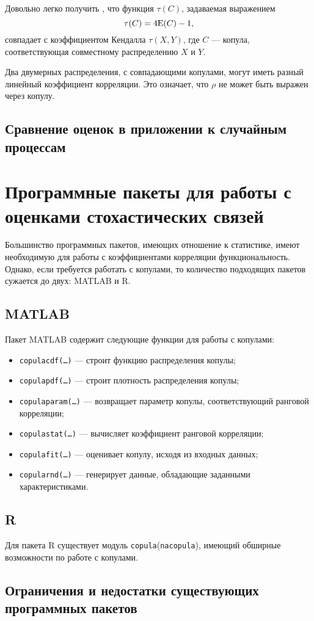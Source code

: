 Довольно легко получить \cite{Nelsen1999}, что функция $\tau(C)$, задаваемая выражением
\begin{equation}
	\tau(C) = 4\mathrm{E}(C) - 1,
\end{equation}
совпадает с коэффициентом Кендалла $\tau(X, Y)$, где $C$ --- копула, соответствующая совместному распределению $X$ и $Y$.

Два двумерных распределения, с совпадающими копулами, могут иметь разный линейный коэффициент корреляции. Это означает, что $\rho$ не может быть выражен через копулу.

\subsection*{Сравнение оценок в приложении к случайным процессам}

\section*{Программные пакеты для работы с оценками стохастических связей}
Большинство программных пакетов, имеющих отношение к статистике, имеют необходимую для работы с коэффициентами корреляции функциональность. Однако, если требуется работать с копулами, то количество подходящих пакетов сужается до двух: MATLAB и R.

\subsection*{MATLAB}
Пакет MATLAB содержит следующие функции для работы с копулами:
\begin{itemize}
	\item \texttt{copulacdf(\ldots)} --- строит функцию распределения копулы;
	\item \texttt{copulapdf(\ldots)} --- строит плотность распределения копулы;
	\item \texttt{copulaparam(\ldots)} --- возвращает параметр копулы, соответствующий ранговой корреляции;
	\item \texttt{copulastat(\ldots)} --- вычисляет коэффициент ранговой корреляции;
	\item \texttt{copulafit(\ldots)} --- оценивает копулу, исходя из входных данных;
	\item \texttt{copularnd(\ldots)} --- генерирует данные, обладающие заданными характеристиками.
\end{itemize}

\subsection*{R}
Для пакета R существует модуль \texttt{copula}(\texttt{nacopula}), имеющий обширные возможности \cite{Rcopula} по работе с копулами.

\subsection*{Ограничения и недостатки существующих программных пакетов}

\clearpage
